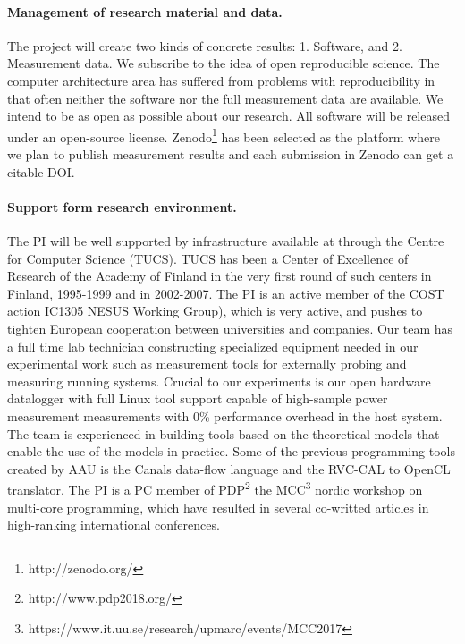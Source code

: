 \documentclass{article}
\begin{document}
\paragraph{Management of research material and data. }
The project will create two kinds of concrete results: 1. Software, and 2. Measurement data. 
We subscribe to the idea of open reproducible science. 
The computer architecture area has suffered from problems with reproducibility in that often neither the software nor the full measurement data are available. 
We intend to be as open as possible about our research. 
All software will be released under an open-source license. 
Zenodo\footnote{http://zenodo.org/} has been selected as the platform where we plan to publish measurement results and each submission in Zenodo can get a citable DOI.

\paragraph{Support form research environment. }
The PI will be well supported by infrastructure available at through the Centre for Computer Science (TUCS).
TUCS has been a Center of Excellence of Research of the Academy of Finland in the very first round of such centers in Finland, 1995-1999 and in 2002-2007. 
The PI is an active member of the COST action IC1305 NESUS Working Group), which is very active, and pushes to tighten European cooperation between universities and companies.
Our team has a full time lab technician constructing specialized equipment needed in our experimental work such as measurement tools for externally probing and measuring running systems. 
Crucial to our experiments is our open hardware datalogger with full Linux tool support capable of high-sample power measurement measurements with 0\% performance overhead in the host system. 
The team is experienced in building tools based on the theoretical models that enable the use of the models in practice. 
Some of the previous programming tools created by AAU is the Canals data-flow language and the RVC-CAL to OpenCL translator. 
The PI is a PC member of PDP\footnote{http://www.pdp2018.org/} the MCC\footnote{https://www.it.uu.se/research/upmarc/events/MCC2017} nordic workshop on multi-core programming, which have resulted in several co-writted articles in high-ranking international conferences.
\end{document}
